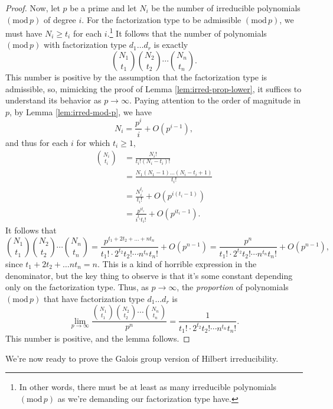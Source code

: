 \documentclass[12pt]{amsart}
\theoremstyle{definition} \newtheorem*{notation}{Notation}
\theoremstyle{remark} \newtheorem*{remark}{Remark}
\theoremstyle{remark} \newtheorem*{example}{Example}
\theoremstyle{definition} \newtheorem*{definition}{Definition}
\numberwithin{equation}{section}
\numberwithin{theorem}{section}
\renewcommand{\pmod}[1]{\left(\mathrm{mod}\,#1\right)}
\begin{document}
\begin{proof}
		Now, let $p$ be a prime and let $N_i$ be the number of irreducible polynomials $\pmod{p}$ of degree $i$.  For the factorization type to be admissible $\pmod{p}$, we must have $N_i \geq t_i$ for each $i$.\footnote{In other words, there must be at least as many irreducible polynomials $\pmod{p}$ as we're demanding our factorization type have.}  It follows that the number of polynomials $\pmod{p}$ with factorization type $d_1\dots d_r$ is exactly
			\[
				\binom{N_1}{t_1} \binom{N_2}{t_2} \cdots \binom{N_n}{t_n}.
			\]
		This number is positive by the assumption that the factorization type is admissible, so, mimicking the proof of Lemma \ref{lem:irred-prop-lower}, it suffices to understand its behavior as $p \to \infty$.  Paying attention to the order of magnitude in $p$, by Lemma \ref{lem:irred-mod-p}, we have
			\[
				N_i = \frac{p^i}{i} + O(p^{i-1}),
			\]
		and thus for each $i$ for which $t_i \geq 1$,
			\begin{align*}
				\binom{N_i}{t_i}
					&= \frac{N_i!}{t_i! (N_i-t_i)!} \\
					&= \frac{N_1 (N_1 - 1) \dots (N_i - t_i+1)}{t_i!} \\
					&= \frac{N_i^{t_i}}{t_i!} + O(p^{i(t_i-1)}) \\
					&= \frac{p^{it_i}}{ i^{t_i} t_i!} + O(p^{it_i-1}).
			\end{align*}
		It follows that
			\[
				\binom{N_1}{t_1} \binom{N_2}{t_2} \cdots \binom{N_n}{t_n}
					= \frac{p^{t_1 + 2t_2 + \dots + nt_n}}{t_1! \cdot 2^{t_2} t_2! \cdots n^{t_n} t_n!} + O(p^{n-1})
					= \frac{p^n}{t_1! \cdot 2^{t_2} t_2! \cdots n^{t_n} t_n!} + O(p^{n-1}),
			\]
		since $t_1 + 2t_2 + \dots nt_n = n$.
		This is a kind of horrible expression in the denominator, but the key thing to observe is that it's some constant depending only on the factorization type.  Thus, as $p \to \infty$, the \emph{proportion} of polynomials $\pmod{p}$ that have factorization type $d_1\dots d_r$ is
			\[
				\lim_{p \to \infty} \frac{ \binom{N_1}{t_1} \binom{N_2}{t_2} \cdots \binom{N_n}{t_n}}{p^n}
					= \frac{1}{t_1! \cdot 2^{t_2} t_2! \cdots n^{t_n} t_n!}.
			\]
		This number is positive, and the lemma follows.
	\end{proof}
	
	We're now ready to prove the Galois group version of Hilbert irreducibility.
	
\end{document}
